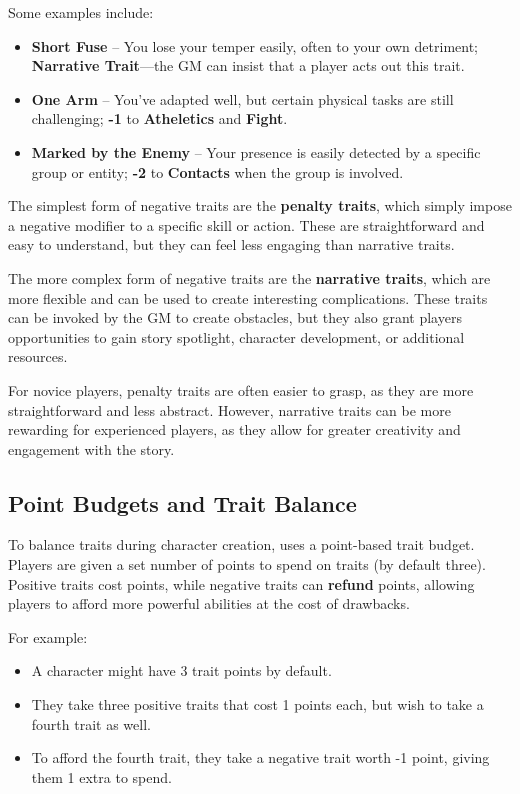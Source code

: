 Some examples include:

\begin{itemize}
    \item \textbf{Short Fuse} – You lose your temper easily, often to your own detriment; \textbf{Narrative Trait}---the GM can insist that a player acts out this trait.
    \item \textbf{One Arm} – You’ve adapted well, but certain physical tasks are still challenging; \textbf{-1} to \textbf{Atheletics} and \textbf{Fight}.
    \item \textbf{Marked by the Enemy} – Your presence is easily detected by a specific group or entity; \textbf{-2} to \textbf{Contacts} when the group is involved.
\end{itemize}

The simplest form of negative traits are the \textbf{penalty traits}, which simply impose a negative modifier to a specific skill or action. These are straightforward and easy to understand, but they can feel less engaging than narrative traits.

The more complex form of negative traits are the \textbf{narrative traits}, which are more flexible and can be used to create interesting complications. These traits can be invoked by the GM to create obstacles, but they also grant players opportunities to gain story spotlight, character development, or additional resources.

For novice players, penalty traits are often easier to grasp, as they are more straightforward and less abstract. However, narrative traits can be more rewarding for experienced players, as they allow for greater creativity and engagement with the story.

\subsection{Point Budgets and Trait Balance}

To balance traits during character creation, \wyrd uses a point-based trait budget. Players are given a set number of points to spend on traits (by default three). Positive traits cost points, while negative traits can \textbf{refund} points, allowing players to afford more powerful abilities at the cost of drawbacks.

For example:
\begin{itemize}
    \item A character might have 3 trait points by default.
    \item They take three positive traits that cost 1 points each, but wish to take a fourth trait as well.
    \item To afford the fourth trait, they take a negative trait worth -1 point, giving them 1 extra to spend.
\end{itemize}

